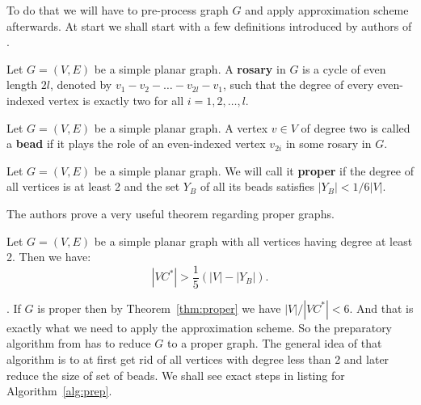 To do that we will have to pre-process graph $G$ and apply approximation scheme afterwards.
At start we shall start with a few definitions introduced by authors of
\cite{bar-yehudaApproximatingVertexCover1982}.


\begin{defn} \label{def:rosary}
    Let $G = (V, E)$ be a simple planar graph. A \textbf{rosary} in $G$ is a cycle 
of even length $2l$, denoted by $v_1 - v_2 - \dots - v_{2l} - v_1$, such that the
degree of every even-indexed vertex is exactly two
for all $i = 1, 2, \dots, l$.
\end{defn}
\begin{defn}  \label{def:bead}
Let $G = (V, E)$ be a simple planar graph. A vertex $v \in V$ of degree two is
called a \textbf{bead} if it plays the role of an even-indexed vertex $v_{2i}$ in
some rosary in $G$.
\end{defn}
\begin{defn}
    Let $G = (V, E)$ be a simple planar graph. We will call it \textbf{proper} if the degree
    of all vertices is at least 2 and the set $Y_B$ of all its beads satisfies
$|Y_B| < 1/6 |V|$.
\end{defn}
\noindent
The authors prove a very useful
theorem regarding proper graphs.
\begin{theorem} \cite{bar-yehudaApproximatingVertexCover1982} \label{thm:proper}
    Let $G = (V, E)$ be a simple planar graph with all vertices having degree at
    least 2. Then we have:
    $$
    |VC^*| > \frac{1}{5}(|V| - |Y_B|).
    $$
\end{theorem}
\noindent.
If $G$ is proper then by Theorem~\ref{thm:proper} we have $|V|/|VC^*| < 6$. And that is exactly 
what we need to apply the approximation scheme. So the preparatory algorithm from
\cite{bar-yehudaApproximatingVertexCover1982} has to reduce $G$ to a proper graph. The general
idea of that algorithm is to at first get rid of all vertices with degree less than 2 and later 
reduce the size of set of beads. We shall see exact steps in listing for Algorithm~\ref{alg:prep}.

